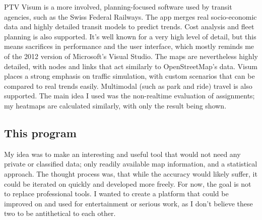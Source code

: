 PTV Visum is a more involved, planning-focused software used by transit agencies, such as the Swiss Federal Railways. The app merges real socio-economic data and highly detailed transit models to predict trends. Cost analysis and fleet planning is also supported. It's well known for a very high level of detail, but this means sacrifices in performance and the user interface, which mostly reminds me of the 2012 version of Microsoft's Visual Studio. The maps are nevertheless highly detailed, with nodes and links that act similarly to OpenStreetMap's data. Visum places a strong emphasis on traffic simulation, with custom scenarios that can be compared to real trends easily. Multimodal (such as park and ride) travel is also supported. The main idea I used was the non-realtime evaluation of assignments; my heatmaps are calculated similarly, with only the result being shown.

\subsection{This program}

My idea was to make an interesting and useful tool that would not need any private or classified data; only readily available map information, and a statistical approach. The thought process was, that while the accuracy would likely suffer, it could be iterated on quickly and developed more freely. For now, the goal is not to replace professional tools. I wanted to create a platform that could be improved on and used for entertainment or serious work, as I don't believe these two to be antithetical to each other. %
